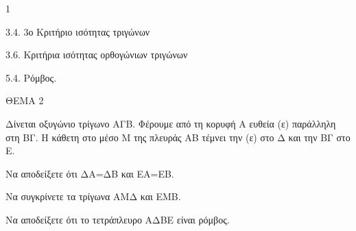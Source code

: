 \begin{ylh}{1}
    \item 3.4. 3ο Κριτήριο ισότητας τριγώνων
    \item 3.6. Κριτήρια ισότητας ορθογώνιων τριγώνων
    \item 5.4. Ρόμβος.
\end{ylh}

ΘΕΜΑ 2

Δίνεται οξυγώνιο τρίγωνο ΑΓΒ. Φέρουμε από τη κορυφή Α ευθεία (ε) παράλληλη στη ΒΓ. Η κάθετη στο μέσο Μ της πλευράς ΑΒ τέμνει την (ε) στο Δ και την ΒΓ στο Ε.

\begin{alist}
\item Να αποδείξετε ότι ΔΑ=ΔΒ και ΕΑ=ΕΒ. 

\item Να συγκρίνετε τα τρίγωνα ΑΜΔ και ΕΜΒ. 

\item Να αποδείξετε ότι το τετράπλευρο ΑΔΒΕ είναι ρόμβος. 


\begin{center}
\end{center}
\end{alist}
